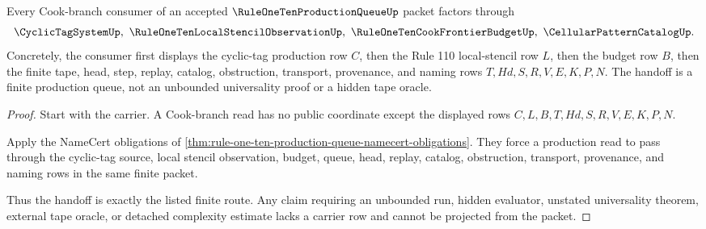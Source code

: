 \begin{theorem}
\label{thm:rule-one-ten-production-queue-cook-branch-handoff}
Every Cook-branch consumer of an accepted $\RuleOneTenProductionQueueUp$ packet factors through
$$
\CyclicTagSystemUp,\ \RuleOneTenLocalStencilObservationUp,\ \RuleOneTenCookFrontierBudgetUp,\ \CellularPatternCatalogUp .
$$
Concretely, the consumer first displays the cyclic-tag production row $C$, then the Rule 110 local-stencil row $L$, then the budget row $B$, then the finite tape, head, step, replay, catalog, obstruction, transport, provenance, and naming rows $T,Hd,S,R,V,E,K,P,N$. The handoff is a finite production queue, not an unbounded universality proof or a hidden tape oracle.
\end{theorem}
\begin{proof}
Start with the carrier. A Cook-branch read has no public coordinate except the displayed rows $C,L,B,T,Hd,S,R,V,E,K,P,N$.

Apply the NameCert obligations of \autoref{thm:rule-one-ten-production-queue-namecert-obligations}. They force a production read to pass through the cyclic-tag source, local stencil observation, budget, queue, head, replay, catalog, obstruction, transport, provenance, and naming rows in the same finite packet.

Thus the handoff is exactly the listed finite route. Any claim requiring an unbounded run, hidden evaluator, unstated universality theorem, external tape oracle, or detached complexity estimate lacks a carrier row and cannot be projected from the packet.
\end{proof}



